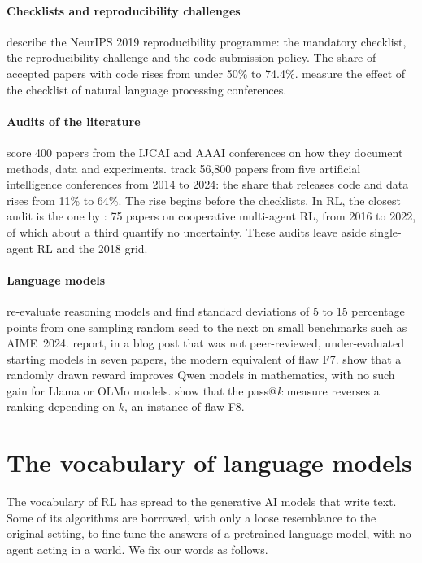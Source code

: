 \paragraph{Checklists and reproducibility challenges}
\textcite{pineau2021improving} describe the NeurIPS 2019 reproducibility programme: the mandatory
checklist, the reproducibility challenge and the code submission policy. The share of accepted papers
with code rises from under 50\% to 74.4\%. \textcite{magnusson2023nlpchecklist} measure the effect of
the checklist of natural language processing conferences.

\paragraph{Audits of the literature}
\textcite{gundersen2018state} score 400 papers from the IJCAI and AAAI conferences on how they document
methods, data and experiments. \textcite{coakley2026shift} track 56,800 papers from five
artificial intelligence conferences from 2014 to 2024: the share that releases code and data rises
from 11\% to 64\%. The rise begins before the checklists. In RL, the closest audit is the one by
\textcite{gorsane2022marl}: 75 papers on cooperative multi-agent RL, from 2016 to 2022, of which about
a third quantify no uncertainty. These audits leave aside single-agent RL and the 2018 grid.

\paragraph{Language models}
\textcite{hochlehnert2025sober} re-evaluate reasoning models and find standard deviations of 5 to 15
percentage points from one sampling random seed to the next on small benchmarks such as AIME~2024.
\textcite{chandak2025incorrect} report, in a blog post that was not peer-reviewed, under-evaluated
starting models in seven papers, the modern equivalent of flaw F7. \textcite{shao2025spurious} show
that a randomly drawn reward improves Qwen models in mathematics, with no such gain for Llama or OLMo
models. \textcite{yue2025rlvr} show that the pass@$k$ measure reverses a ranking depending on $k$, an
instance of flaw F8.

\section{The vocabulary of language models}\label{sec:vocabulaire}

The vocabulary of RL has spread to the generative AI models that write text. Some of its algorithms
are borrowed, with only a loose resemblance to the original setting, to fine-tune the answers of a
pretrained language model, with no agent acting in a world. We fix our words as follows.

